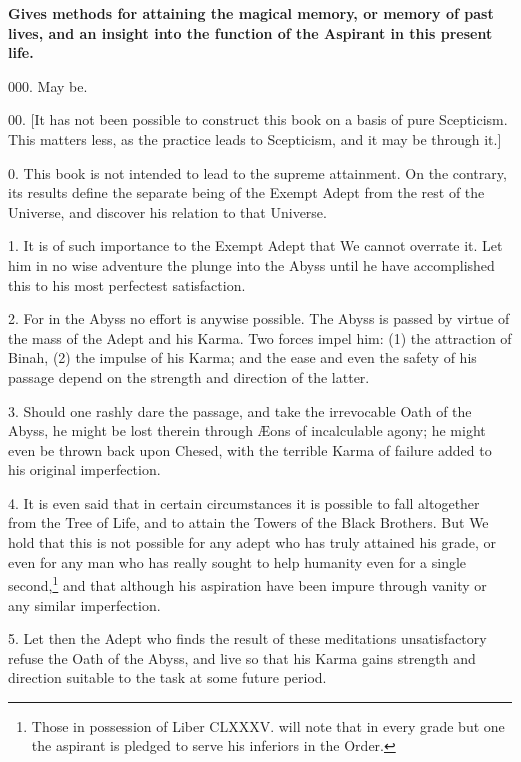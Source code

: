 \textbf{Gives methods for attaining the magical memory, or memory of past lives, and an insight into the function of the Aspirant in this present life.}

000. May be.

00. [It has not been possible to construct this book on a basis of pure Scepticism. This matters less, as the practice leads to Scepticism, and it may be through it.]

0. This book is not intended to lead to the supreme attainment. On the contrary, its results define the separate being of the Exempt Adept from the rest of the Universe, and discover his relation to that Universe.

1. It is of such importance to the Exempt Adept that We cannot overrate it. Let him in no wise adventure the plunge into the Abyss until he have accomplished this to his most perfectest satisfaction.

2. For in the Abyss no effort is anywise possible. The Abyss is passed by virtue of the mass of the Adept and his Karma. Two forces impel him: (1) the attraction of Binah, (2) the impulse of his Karma; and the ease and even the safety of his passage depend on the strength and direction of the latter.

3. Should one rashly dare the passage, and take the irrevocable Oath of the Abyss, he might be lost therein through \AE{}ons of incalculable agony; he might even be thrown back upon Chesed, with the terrible Karma of failure added to his original imperfection.

4. It is even said that in certain circumstances it is possible to fall altogether from the Tree of Life, and to attain the Towers of the Black Brothers. But We hold that this is not possible for any adept who has truly attained his grade, or even for any man who has really sought to help humanity even for a single second,\footnote{Those in possession of Liber CLXXXV. will note that in every grade but one the aspirant is pledged to serve his inferiors in the Order.} and that although his aspiration have been impure through vanity or any similar imperfection.

5. Let then the Adept who finds the result of these meditations unsatisfactory refuse the Oath of the Abyss, and live so that his Karma gains strength and direction suitable to the task at some future period.

